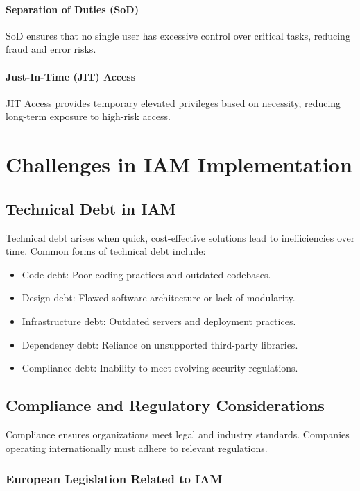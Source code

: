 \paragraph{Separation of Duties (SoD)}
SoD ensures that no single user has excessive control over critical tasks, reducing fraud and error risks.

\paragraph{Just-In-Time (JIT) Access}
JIT Access provides temporary elevated privileges based on necessity, reducing long-term exposure to high-risk access.

\section{Challenges in IAM Implementation}

\subsection{Technical Debt in IAM}
Technical debt arises when quick, cost-effective solutions lead to inefficiencies over time\citep{TechinicalDebtOUTsystem}. Common forms of technical debt include:
\begin{itemize}
	\item Code debt: Poor coding practices and outdated codebases.
	\item Design debt: Flawed software architecture or lack of modularity.
	\item Infrastructure debt: Outdated servers and deployment practices.
	\item Dependency debt: Reliance on unsupported third-party libraries.
	\item Compliance debt: Inability to meet evolving security regulations.
\end{itemize}

\subsection{Compliance and Regulatory Considerations}
Compliance ensures organizations meet legal and industry standards\citep{2024compliance?}. Companies operating internationally must adhere to relevant regulations.

\subsubsection{European Legislation Related to IAM}
